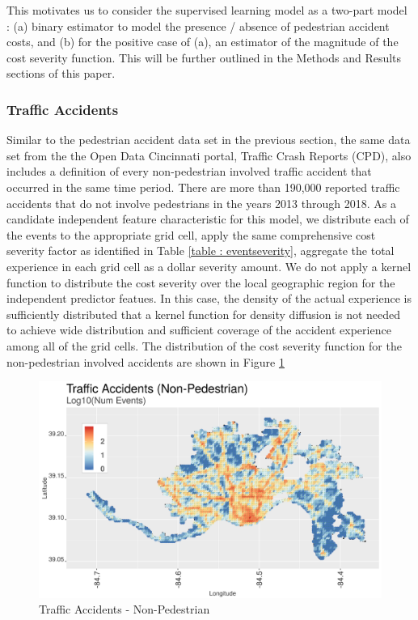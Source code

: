 \documentclass{llncs}
\begin{document}
This motivates us to consider the supervised learning model as a two-part model : (a) binary estimator to model the presence / absence of pedestrian accident costs, and (b) for the positive case of (a), an estimator of the magnitude of the cost severity function. This will be further outlined in the Methods and Results sections of this paper.


\subsubsection{Traffic Accidents}

Similar to the pedestrian accident data set in the previous section, the same data set from the the Open Data Cincinnati portal, Traffic Crash Reports (CPD), also includes a definition of every non-pedestrian involved traffic accident that occurred in the same time period.  There are more than 190,000 reported traffic accidents that do not involve pedestrians in the years 2013 through 2018. As a candidate independent feature characteristic for this model, we distribute each of the events to the appropriate grid cell, apply the same comprehensive cost severity factor as identified in Table \ref{table : eventseverity}, aggregate the total experience in each grid cell as a dollar severity amount. We do not apply a kernel function to distribute the cost severity over the local geographic region for the independent predictor featues. In this case, the density of the actual experience is sufficiently distributed that a kernel function for density diffusion is not needed to achieve wide distribution and sufficient coverage of the accident experience among all of the grid cells. The distribution of the cost severity function for the non-pedestrian involved accidents are shown in Figure \ref{figure : trafficAccidentsNonPedestrian}

\FloatBarrier
\begin{figure}
 	\includegraphics[width=\textwidth, height=\textheight, keepaspectratio]{trafficAccidentsNonPedestrian}
 	\caption{Traffic Accidents - Non-Pedestrian}
	\label{figure : trafficAccidentsNonPedestrian}
\end{figure}
\FloatBarrier
\end{document}
